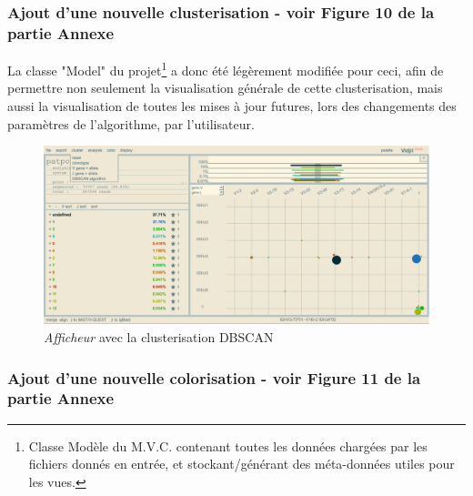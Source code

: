 \documentclass[pdftex,12pt,a4paper]{report}
\begin{document}
\begin{spacing}{1.2}
\subsubsection{Ajout d'une nouvelle clusterisation - voir \textbf{Figure 10} de la partie \textbf{Annexe}}

La classe "Model" du projet\footnote{Classe Modèle du M.V.C. contenant toutes les données chargées par les fichiers donnés en entrée, et stockant/générant des méta-données utiles pour les vues.} a donc été légèrement modifiée pour ceci, afin de permettre non seulement la visualisation générale de cette clusterisation, mais aussi la visualisation de toutes les mises à jour futures, lors des changements des paramètres de l'algorithme, par l'utilisateur.

\begin{figure}[H]
\begin{center}
	\includegraphics[scale=0.35]{img/DBSCAN-Cluster-Ex.jpg}
\end{center}
\caption{\textit{Afficheur} avec la clusterisation DBSCAN}
\end{figure}

\subsubsection{Ajout d'une nouvelle colorisation - voir \textbf{Figure 11} de la partie \textbf{Annexe}}


\end{spacing}
\end{document}
